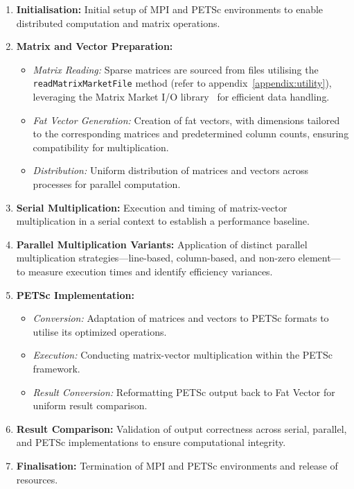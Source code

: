 \documentclass[12pt,oneside]{book} %
\begin{document}
\begin{enumerate}
    \item \textbf{Initialisation:} Initial setup of MPI and PETSc environments to enable distributed computation and matrix operations.
    \item \textbf{Matrix and Vector Preparation:}
          \begin{itemize}
              \item \textit{Matrix Reading:} Sparse matrices are sourced from files utilising the \texttt{readMatrixMarketFile} method (refer to appendix~\ref{appendix:utility}), leveraging the Matrix Market I/O library~\cite{Lugowski2023FastMatrixMarket} for efficient data handling.
              \item \textit{Fat Vector Generation:} Creation of fat vectors, with dimensions tailored to the corresponding matrices and predetermined column counts, ensuring compatibility for multiplication.
              \item \textit{Distribution:} Uniform distribution of matrices and vectors across processes for parallel computation.
          \end{itemize}
    \item \textbf{Serial Multiplication:} Execution and timing of matrix-vector multiplication in a serial context to establish a performance baseline.
    \item \textbf{Parallel Multiplication Variants:} Application of distinct parallel multiplication strategies—line-based, column-based, and non-zero element—to measure execution times and identify efficiency variances.
    \item \textbf{PETSc Implementation:}
          \begin{itemize}
              \item \textit{Conversion:} Adaptation of matrices and vectors to PETSc formats to utilise its optimized operations.
              \item \textit{Execution:} Conducting matrix-vector multiplication within the PETSc framework.
              \item \textit{Result Conversion:} Reformatting PETSc output back to Fat Vector for uniform result comparison.
          \end{itemize}
    \item \textbf{Result Comparison:} Validation of output correctness across serial, parallel, and PETSc implementations to ensure computational integrity.
    \item \textbf{Finalisation:} Termination of MPI and PETSc environments and release of resources.
\end{enumerate}
\end{document}
